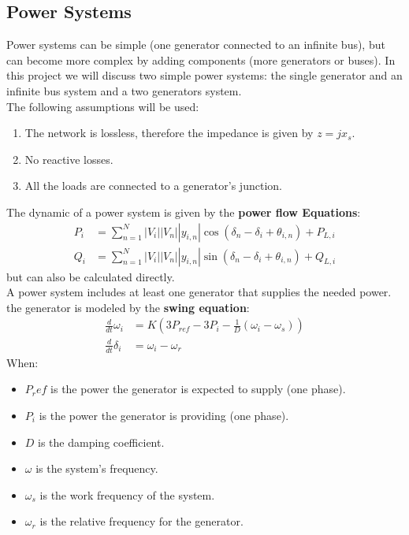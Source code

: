 \documentclass[12pt,English]{article}
\begin{document}
\subsection{Power Systems}
Power systems can be simple (one generator connected to an infinite bus), but can become more complex by adding components (more generators or buses). In this project we will discuss two simple power systems: the single generator and an infinite bus system and a two generators system.\\ 
The following assumptions will be used:
\begin{enumerate}
\item The network is lossless, therefore the impedance is given by $z = jx_{s} $.
\item No reactive losses.
\item All the loads are connected to a generator's junction.
\end{enumerate}
The dynamic of a power system is given by the \textbf{power flow Equations}:
\begin{align*}
P_{i}&=\sum_{n=1}^{N}\left|V_{i}\right|\left|V_{n}\right|\left|y_{i,n}\right|\cos\left(\delta_{n}-\delta_{i}+\theta_{i,n}\right)+P_{L,i}\\
Q_{i}&=\sum_{n=1}^{N}\left|V_{i}\right|\left|V_{n}\right|\left|y_{i,n}\right|\sin\left(\delta_{n}-\delta_{i}+\theta_{i,n}\right)+Q_{L,i}
\end{align*}
but can also be calculated directly.\\
A power system includes at least one generator that supplies the needed power. the generator is modeled by the \textbf{swing equation}:
\begin{align*}
\frac{d}{dt}\omega_{i}&=K\left(3P_{ref}-3P_{i}-\frac{1}{D}\left(\omega_{i}-\omega_{s}\right)\right)\\
\frac{d}{dt}\delta_{i}&=\omega_{i}-\omega_r   
\end{align*}
When:
\begin{itemize}
\item $P_ref$ is the power the generator is expected to supply (one phase).
\item $P_i$ is the power the generator is providing (one phase).
\item $D$ is the damping coefficient.
\item $\omega$ is the system's frequency.
\item $\omega_s$ is the work frequency of the system.
\item $\omega_r$ is the relative frequency for the generator.
\end{itemize}
\end{document}

